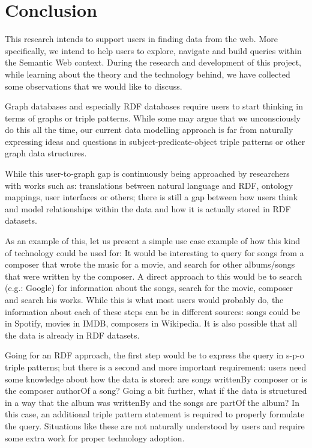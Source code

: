 \chapter{Conclusion}
\label{chap:Conclusion}

This research intends to support users in finding data from the web. More specifically, we intend to help users to explore, navigate and build queries within the Semantic Web context. During the research and development of this project, while learning about the theory and the technology behind, we have collected some observations that we would like to discuss.

Graph databases and especially RDF databases require users to start thinking in terms of graphs or triple patterns. While some may argue that we unconsciously do this all the time, our current data modelling approach is far from naturally expressing ideas and questions in subject-predicate-object triple patterns or other graph data structures.

While this user-to-graph gap is continuously being approached by researchers with works such as: translations between natural language and RDF, ontology mappings, user interfaces or others; there is still a gap between how users think and model relationships within the data and how it is actually stored in RDF datasets.

As an example of this, let us present a simple use case example of how this kind of technology could be used for: It would be interesting to query for songs from a composer that wrote the music for a movie, and search for other albums/songs that were written by the composer. A direct approach to this would be to search (e.g.: Google) for information about the songs, search for the movie, composer and search his works. While this is what most users would probably do, the information about each of these steps can be in different sources: songs could be in Spotify, movies in IMDB, composers in Wikipedia. It is also possible that all the data is already in RDF datasets.

Going for an RDF approach, the first step would be to express the query in s-p-o triple patterns; but there is a second and more important requirement: users need some knowledge about how the data is stored: are songs writtenBy composer or is the composer authorOf a song? Going a bit further, what if the data is structured in a way that the album was writtenBy and the songs are partOf the album? In this case, an additional triple pattern statement is required to properly formulate the query. Situations like these are not naturally understood by users and require some extra work for proper technology adoption.

